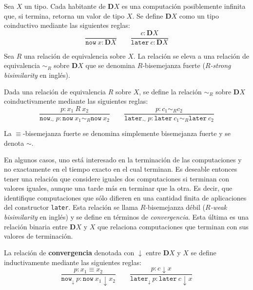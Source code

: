 \begin{definition}
Sea $X$ un tipo. Cada habitante de $\mathbf{D} X$ es una computación posiblemente infinita que, si termina, retorna un valor de tipo $X$. Se define $\mathbf{D} X$ como un tipo coinductivo mediante las siguientes reglas:
\begin{equation*}
\dfrac{}{\mathtt{now} \ x : \mathbf{D} X} 	\qquad  	\dfrac{c : \mathbf{D} X}{\mathtt{later} \ c : \mathbf{D} X}
\end{equation*}
\end{definition}

Sea $R$ una relación de equivalencia sobre $X$. La relación se eleva a una relación de equivalencia $\sim_R$ sobre $\mathbf{D}X$ que se denomina $R$-bisemejanza fuerte (\textit{$R$-strong bisimilarity} en inglés). 

\begin{definition}
Dada una relación de equivalencia $R$ sobre $X$, se define la relación $\sim_R$ sobre $\mathbf{D}X$ coinductivamente mediante las siguientes reglas:
\begin{equation*}
\dfrac{p : x_1 \ R \ x_2}{\mathtt{now}_{\sim} \ p : \mathtt{now} \ x_1 \sim_R \mathtt{now} \ x_2}  	\qquad  	\dfrac{p : c_1 \sim_R c_2}{\mathtt{later}_{\sim} \ p : \mathtt{later} \ c_1 \sim_R \mathtt{later} \ c_2}
\end{equation*}
\end{definition}

La $\equiv$-bisemejanza fuerte se denomina simplemente bisemejanza fuerte y se denota $\sim$.

En algunos casos, uno está interesado en la terminación de las computaciones y no exactamente en el tiempo exacto en el cual terminan. Es deseable entonces tener una relación que considere iguales dos computaciones si terminan con valores iguales, aunque una tarde más en terminar que la otra. Es decir, que identifique computaciones que sólo difieren en una cantidad finita de aplicaciones del constructor \texttt{later}. Esta relación se llama $R$-bisemejanza débil (\textit{$R$-weak bisimilarity} en inglés) y se define en términos de \textit{convergencia}. Esta última es una relación binaria entre $\mathbf{D}X$ y $X$ que relaciona computaciones que terminan con sus valores de terminación. 

\begin{definition}[Convergencia]
La relación de \textbf{convergencia} denotada con $\downarrow$ entre $\mathbf{D}X$ y $X$ se define inductivamente mediante las siguientes reglas:
\begin{equation*}
\dfrac{p : x_1 \equiv x_2}{\mathtt{now}_{\downarrow}  \ p : \mathtt{now} \ x_1 \downarrow x_2}  	\qquad  	\dfrac{p : c \downarrow x}{\mathtt{later}_{\downarrow} \ p : \mathtt{later} \ c \downarrow x}
\end{equation*}
\end{definition}

